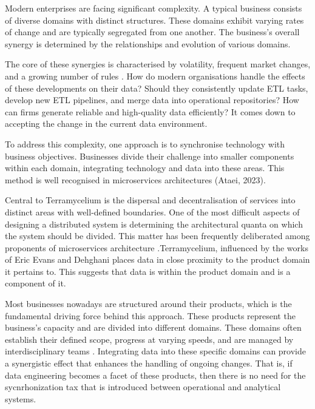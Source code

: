 \documentclass[review]{elsarticle}
\begin{document}
Modern enterprises are facing significant complexity. A typical business consists of diverse domains with distinct structures. These domains exhibit varying rates of change and are typically segregated from one another. The business's overall synergy is determined by the relationships and evolution of various domains. 

The core of these synergies is characterised by volatility, frequent market changes, and a growing number of rules \cite{popovivc2018impact}. How do modern organisations handle the effects of these developments on their data? Should they consistently update ETL tasks, develop new ETL pipelines, and merge data into operational repositories? How can firms generate reliable and high-quality data efficiently? It comes down to accepting the change in the current data environment. 

To address this complexity, one approach is to synchronise technology with business objectives. Businesses divide their challenge into smaller components within each domain, integrating technology and data into these areas. This method is well recognised in microservices architectures (Ataei, 2023). 

Central to Terramycelium is the dispersal and decentralisation of services into distinct areas with well-defined boundaries. One of the most difficult aspects of designing a distributed system is determining the architectural quanta on which the system should be divided. This matter has been frequently deliberated among proponents of microservices architecture \cite{merson2020modeling}.Terramycelium, influenced by the works of Eric Evans \cite{evans2004domain} and Dehghani \cite{DataMesh} places data in close proximity to the product domain it pertains to. This suggests that data is within the product domain and is a component of it.

Most businesses nowadays are structured around their products, which is the fundamental driving force behind this approach. These products represent the business's capacity and are divided into different domains. These domains often establish their defined scope, progress at varying speeds, and are managed by interdisciplinary teams \cite{teamtopologiesSkelton}. Integrating data into these specific domains can provide a synergistic effect that enhances the handling of ongoing changes. That is, if data engineering becomes a facet of these products, then there is no need for the sycnrhonization tax that is introduced between operational and analytical systems.
\end{document}

